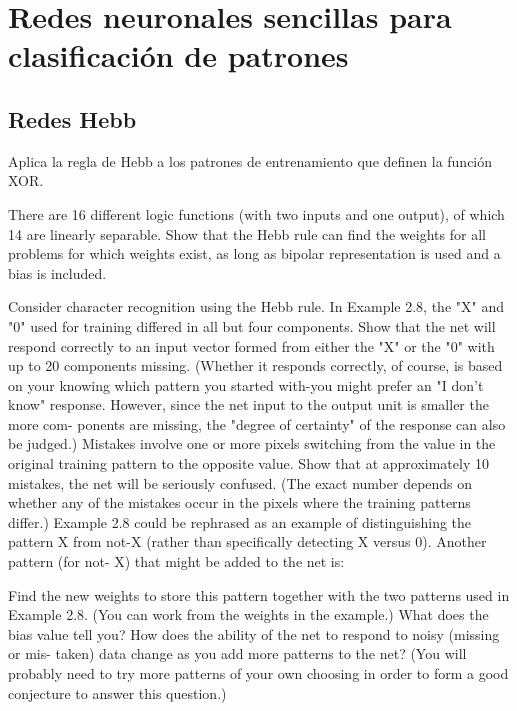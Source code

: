 \section{Redes neuronales sencillas para clasificación de patrones}
\subsection{Redes Hebb}

\begin{problem}[1]
Aplica la regla de Hebb a los patrones de entrenamiento que definen la función XOR.

\solution

\end{problem}

\begin{problem}[2]
There are 16 different logic functions (with two inputs and one output), of which 14
are linearly separable. Show that the Hebb rule can find the weights for all problems
for which weights exist, as long as bipolar representation is used and a bias is included.

\solution

\end{problem}

\begin{problem}[3]
 Consider character recognition using the Hebb rule. In Example 2.8, the "X" and
"0" used for training differed in all but four components. Show that the net will
respond correctly to an input vector formed from either the "X" or the "0" with
up to 20 components missing. (Whether it responds correctly, of course, is based on
your knowing which pattern you started with-you might prefer an "I don't know"
response. However, since the net input to the output unit is smaller the more com-
ponents are missing, the "degree of certainty" of the response can also be judged.)
Mistakes involve one or more pixels switching from the value in the original
training pattern to the opposite value. Show that at approximately 10 mistakes, the
net will be seriously confused. (The exact number depends on whether any of the
mistakes occur in the pixels where the training patterns differ.)
Example 2.8 could be rephrased as an example of distinguishing the pattern X
from not-X (rather than specifically detecting X versus 0). Another pattern (for not-
X) that might be added to the net is:

Find the new weights to store this pattern together with the two patterns used in
Example 2.8. (You can work from the weights in the example.) What does the bias
value tell you? How does the ability of the net to respond to noisy (missing or mis-
taken) data change as you add more patterns to the net? (You will probably need to
try more patterns of your own choosing in order to form a good conjecture to answer
this question.)

\solution

\end{problem}

